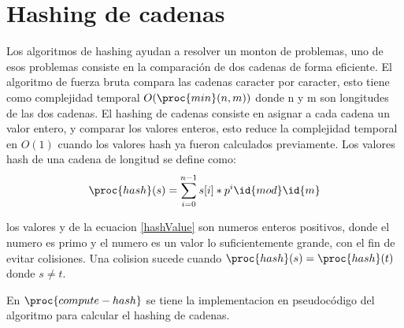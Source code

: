 \section{Hashing de cadenas}
Los algoritmos de hashing ayudan a resolver un monton de problemas, uno de esos problemas consiste en la comparación de dos cadenas de forma eficiente. El algoritmo de fuerza bruta compara las cadenas caracter por caracter, esto tiene como complejidad temporal $O(\proc{min}(n,m))$ donde n y m son longitudes de las dos cadenas. El hashing de cadenas consiste en asignar a cada cadena un valor entero, y comparar los valores enteros, esto reduce la complejidad temporal en $O(1)$ cuando los valores hash ya fueron calculados previamente. Los valores hash de una cadena  de longitud  se define como:
\begin{equation}
  \proc{hash}(s) = \sum_{i=0}^{n-1}{s[i]*p^i \id{mod} \id{m}}
\label{hashValue}
\end{equation}

los valores  y  de la ecuacion \ref{hashValue} son numeros enteros positivos, donde el numero  es primo y el numero  es un valor lo suficientemente grande, con el fin de evitar colisiones. Una colision sucede cuando $\proc{hash}(s)=\proc{hash}(t)$ donde $s \neq t$.

En $\proc{compute-hash}$ se tiene la implementacion en pseudocódigo del algoritmo para calcular el hashing de cadenas.

